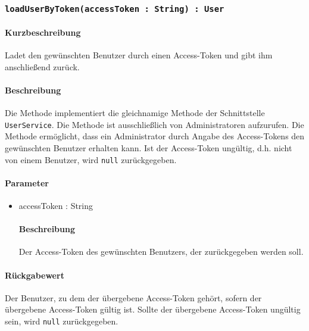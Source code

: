\subsubsection{\texttt{loadUserByToken(accessToken : String) : User}}%
\paragraph*{Kurzbeschreibung}
Ladet den gewünschten Benutzer durch einen Access-Token und gibt ihm anschließend zurück.
\paragraph*{Beschreibung}
Die Methode implementiert die gleichnamige Methode der Schnittstelle \texttt{UserService}.
Die Methode ist ausschließlich von Administratoren aufzurufen.
Die Methode ermöglicht, dass ein Administrator durch Angabe des Access-Tokens den gewünschten Benutzer erhalten kann. 
Ist der Access-Token ungültig, d.h. nicht von einem Benutzer, wird \texttt{null} zurückgegeben.
\paragraph*{Parameter}
\begin{itemize}
    \item accessToken : String
    		\paragraph*{Beschreibung}
    		Der Access-Token des gewünschten Benutzers, der zurückgegeben werden soll.
\end{itemize}
\paragraph*{Rückgabewert}
Der Benutzer, zu dem der übergebene Access-Token gehört, sofern der übergebene Access-Token gültig ist.
Sollte der übergebene Access-Token ungültig sein, wird \texttt{null} zurückgegeben.
